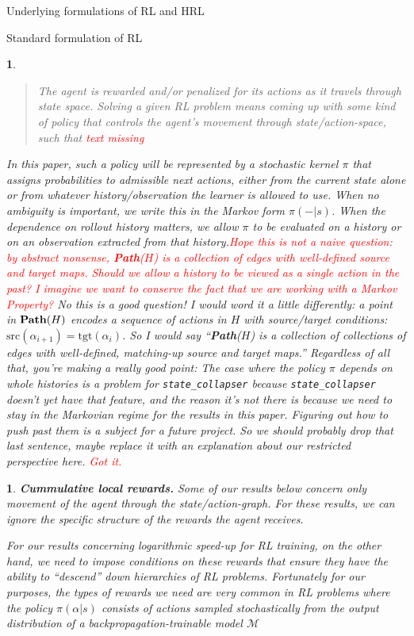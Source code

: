 \documentclass[11pt]{article}
\newtheorem{ermark}[subsubsection]{}
\begin{document}
\begin{section}{Underlying formulations of RL and HRL}
\begin{subsection}{Standard formulation of RL}
\begin{ermark}
\begin{quote}
The agent is rewarded and/or penalized for its actions as it travels through state space. {\em Solving} a given RL problem means coming up with some kind of policy that controls the agent's movement through state/action-space, such that \textcolor{red}{text missing}
\end{quote}
In this paper, such a policy will be represented by a stochastic kernel $\pi$ that assigns probabilities to admissible next actions, either from the current state alone or from whatever history/observation the learner is allowed to use. When no ambiguity is important, we write this in the Markov form $\pi(-|s)$. When the dependence on rollout history matters, we allow $\pi$ to be evaluated on a history or on an observation extracted from that history.\textcolor{red}{Hope this is not a naive question: by abstract nonsense, \textbf{Path}($H$) is a collection of edges with well-defined source and target maps. Should we allow a history to be viewed as a single action in the past? I imagine we want to conserve the fact that we are working with a Markov Property?} {\color{blue} No this is a good question! I would word it a little differently: a point in $\bold{Path}(H)$ encodes a sequence of actions in $H$ with source/target conditions: $\text{src}(\alpha_{i+1})=\text{tgt}(\alpha_{i})$. So I would say ``\textbf{Path}($H$) is a collection of {\em collections of} edges with well-defined, {\em matching-up} source and target maps.'' Regardless of all that, you're making a really good point: The case where the policy $\pi$ depends on whole histories is a problem for \texttt{state\_collapser} because \texttt{state\_collapser} doesn't yet have that feature, and the reason it's not there is because we need to stay in the Markovian regime for the results in this paper. Figuring out how to push past them is a subject for a future project. So we should probably drop that last sentence, maybe replace it with an explanation about our restricted perspective here.} \textcolor{red}{Got it.} 
\end{ermark}
 
 \begin{ermark}
{\bf Cummulative local rewards.}
\normalfont
Some of our results below concern only movement of the agent through the state/action-graph. For these results, we can ignore the specific structure of the rewards the agent receives. 

For our results concerning logarithmic speed-up for RL training, on the other hand, we need to impose conditions on these rewards that ensure they have the ability to ``descend'' down hierarchies of RL problems. Fortunately for our purposes, the types of rewards we need are very common in RL problems where the policy $\pi(\alpha|s)$ consists of actions sampled stochastically from the output distribution of a backpropagation-trainable model $\mathcal{M}$
 \end{ermark}


\end{subsection}
\end{section}
\end{document}
